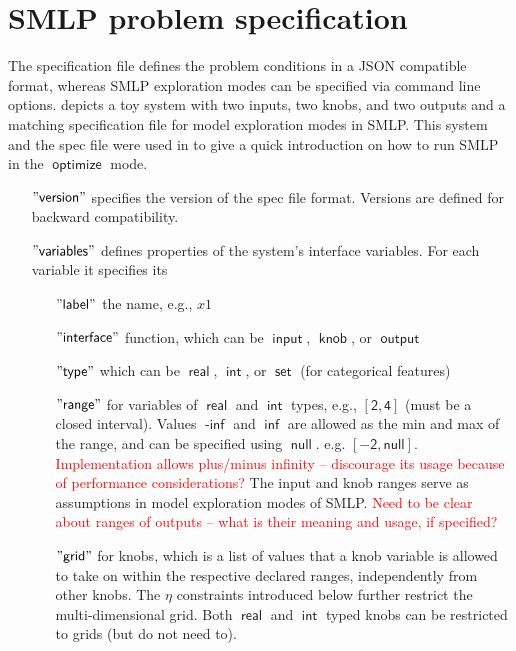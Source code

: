 \documentclass[a4paper,parskip=half]{article} %
\newcommand*\mode[1]{\operatorname{\mathsf{#1}}} %
\newcommand*\dtype[1]{\operatorname{\mathsf{#1}}} %
\newcommand*\speckey[1]{\operatorname{\mathsf{"{#1}"}}} %
\newcommand*\specval[1]{\operatorname{\mathsf{{#1}}}} %
\newcommand\todozk[1]{\textcolor{red}{#1}}
\newcommand*\ZK{\todozk}
\begin{document}
\section{SMLP problem specification}\label{sec:spec}

The specification file defines the problem conditions in a JSON compatible format, whereas SMLP exploration modes 
can be specified via command line options.  depicts a toy system with two inputs, two knobs, 
and two outputs and a matching specification file for model exploration modes in SMLP. This system and the spec file 
were used in  to give a quick introduction on how to run SMLP in the $\mode{optimize}$ mode.


\begin{itemize}
\item[$\speckey{version}$] specifies the version of the spec file format. Versions are defined for backward compatibility.
\item[$\speckey{variables}$] defines properties of the system's interface variables. For each variable it specifies its
\begin{itemize}
\item[$\speckey{label}$] the name, e.g., $x1$
\item[$\speckey{interface}$]  function, which can be $\dtype{input}$, $\dtype{knob}$,  or $\dtype{output}$ 
\item[$\speckey{type}$] which can be $\dtype{real}$, $\dtype{int}$, or $\dtype{set}$ (for categorical features)
\item[$\speckey{range}$]  for variables of $\dtype{real}$ and $\dtype{int}$ types, e.g., $\specval{[2,4]}$  
(must be a closed interval). Values $\specval{-\inf}$ and $\specval{\inf}$ are allowed as the min and max of the 
range, and can be specified using $\specval{null}$. e.g. $\specval{[-2, null]}$.
\ZK{Implementation allows plus/minus infinity -- discourage its usage because of performance considerations?}
The input and knob ranges serve as assumptions in model exploration modes of SMLP.
\ZK{Need to be clear about ranges of outputs -- what is their meaning and usage, if specified?}
\item[$\speckey{grid}$] for knobs, which is a list of values that a knob variable is allowed to take on within the
 respective declared ranges, 
independently from other knobs. The $\eta$ constraints introduced below further restrict the multi-dimensional grid. 
Both $\dtype{real}$ and $\dtype{int}$ typed knobs can be restricted to grids (but do not need to).

\end{itemize}
\end{itemize}
\end{document}
